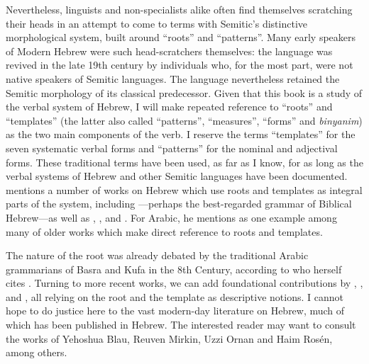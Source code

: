 Nevertheless, linguists and non-specialists alike often find themselves scratching their heads in an attempt to come to terms with Semitic's distinctive morphological system, built around ``roots'' and ``patterns''. Many early speakers of Modern Hebrew were such head-scratchers themselves: the language was revived in the late 19th century by individuals who, for the most part, were not native speakers of Semitic languages. The language nevertheless retained the Semitic morphology of its classical predecessor.
Given that this book is a study of the verbal system of Hebrew, I will make repeated reference to ``roots'' and ``templates'' (the latter also called ``patterns'', ``measures'', ``forms'' and \emph{binyanim}) as the two main components of the verb. I reserve the terms ``templates'' for the seven systematic verbal forms and ``patterns'' for the nominal and adjectival forms. These traditional terms have been used, as far as I know, for as long as the verbal systems of Hebrew and other Semitic languages have been documented. \cite{ussishkin00phd} mentions a number of works on Hebrew which use roots and templates as integral parts of the system, including \cite{gesenius}---perhaps the best-regarded grammar of Biblical Hebrew---as well as \cite{bopp1824}, \cite{ewald1827}, \cite{harris41} and \cite{chomsky51}. For Arabic, he mentions \cite{desacy1810} as one example among many of older works which make direct reference to roots and templates.

The nature of the root was already debated by the traditional Arabic grammarians of Basra and Kufa in the 8th Century, according to \citet[563ff]{borer13oup} who herself cites \cite{owens88}. Turning to more recent works, we can add foundational contributions by \cite{rosen77}, \cite{berman78}, \cite{bolozky78,bolozky99} and \cite{ravid90}, all relying on the root and the template as descriptive notions. I cannot hope to do justice here to the vast modern-day literature on Hebrew, much of which has been published in Hebrew. The interested reader may want to consult the works of Yehoshua Blau, Reuven Mirkin, Uzzi Ornan and Haim Ros\'en, among others.

